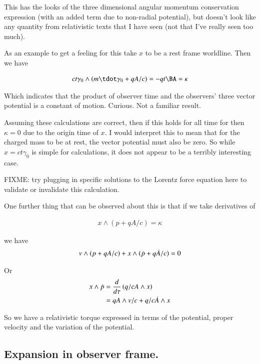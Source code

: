 \documentclass{article}      %
\begin{document}
This has the looks of the three dimensional angular momentum conservation expression (with an added term due to non-radial potential),
but doesn't look like any quantity from relativistic texts that I have seen (not that I've really seen too much).

As an example to get a feeling for this take $x$ to be a rest frame worldline.  Then we have

\begin{align}
c t \gamma_0 \wedge ( m \tdot \gamma_0 + qA/c ) = -q t \BA = \kappa
\end{align}

Which indicates that the product of observer time and the observers' three vector potential is a constant of motion.  Curious.  Not a familiar result.

Assuming these calculations are correct, then if this holds for all time for then $\kappa =0$ due to the origin time of $x$.
I would interpret this to mean that for the charged mass to be at rest, the vector potential must also be zero.  So while $x = ct\gamma_0$ 
is simple for calculations, it does not appear to be a terribly interesting case.

FIXME: try plugging in specific solutions to the Lorentz force equation here to validate or invalidate this calculation.

One further thing that can be observed about this is that if we take derivatives of

\begin{align*}
x \wedge (p + qA/c ) = \kappa
\end{align*}

we have
\begin{align*}
v \wedge (p + qA/c ) + x \wedge (\dot{p} + q\dot{A}/c ) = 0
\end{align*}

Or
\begin{align}\label{eqn:noethersLxTx}
x \wedge \dot{p} &= \frac{d}{d\tau} \left( q/c A \wedge x \right) \\
&= qA \wedge v/c + q/c \dot{A} \wedge x 
\end{align}

So we have a relativistic torque expressed in terms of the potential, proper velocity and the variation of the potential.

\subsection{ Expansion in observer frame. } 
\end{document}
